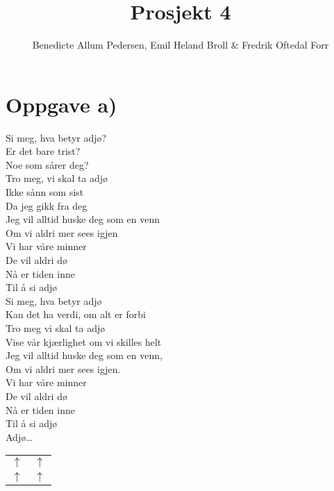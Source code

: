 \documentclass{article}
\title{Prosjekt 4}\vspace{-3ex}
\author{Benedicte Allum Pedersen, Emil Heland Broll & Fredrik Oftedal Forr}
\date{\vspace{-5ex}}
\begin{document}
\maketitle

\section*{Oppgave a)}
Si meg, hva betyr adjø?\\
Er det bare trist?\\
Noe som sårer deg?\\
Tro meg, vi skal ta adjø\\
Ikke sånn som sist\\
Da jeg gikk fra deg\\


\noindent Jeg vil alltid huske deg som en venn\\
Om vi aldri mer sees igjen\\
Vi har våre minner\\
De vil aldri dø\\
Nå er tiden inne\\
Til å si adjø\\


\noindent Si meg, hva betyr adjø\\
Kan det ha verdi, om alt er forbi\\
Tro meg vi skal ta adjø\\
Vise vår kjærlighet om vi skilles helt\\
Jeg vil alltid huske deg som en venn,\\
Om vi aldri mer sees igjen.\\


\noindent Vi har våre minner\\
De vil aldri dø\\
Nå er tiden inne\\
Til å si adjø\\
Adjø…\\


\begin{tabular}{c c}
  $\uparrow$ & $\uparrow$\\
  $\uparrow$ & $\uparrow$
\end{tabular}
\end{document}
